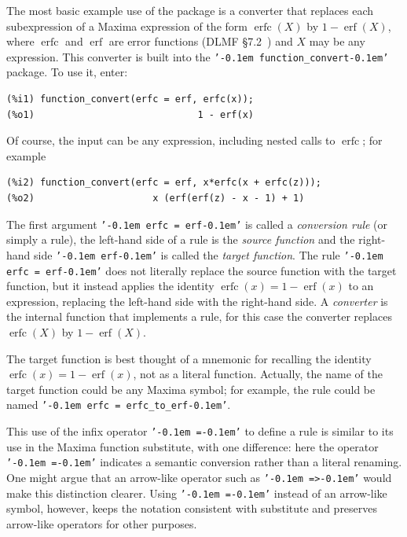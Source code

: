 \documentclass[12pt,fleqn]{extarticle}
\newcommand{\ttq}[1]{\texttt{'\kern-0.1em #1\kern-0.1em'}}
\newcommand{\funconvert}{\ttq{function\_convert}{ }}
\newenvironment{maximabox}
  {\begin{tcolorbox}[
      breakable,
      enhanced,
      colback=white,
      colframe=black!8,
      boxrule=0pt,
      borderline west={2.2pt}{0pt}{black!25},
      arc=1pt,
      left=11pt,
      right=7pt,
      top=9pt,
      bottom=9pt,
      before skip=14pt,
      after skip=14pt
    ]}
  {\end{tcolorbox}}
\DeclareMathOperator{\erf}{erf}
\DeclareMathOperator{\erfc}{erfc}
\begin{document}
The most basic example use of the package is a converter that replaces each subexpression of a Maxima expression of the form  $\erfc(X)$  by $1 - \erf(X)$, where  $\erfc$ and  $\erf$ are error functions (DLMF \S 7.2~\cite{DLMF}) and 
$X$ may be any expression. This converter is built into the \funconvert package. To use it, enter:
\begin{maximabox}
\begin{verbatim}
(%i1) function_convert(erfc = erf, erfc(x));
(%o1)                             1 - erf(x)
\end{verbatim}
\end{maximabox} 
\noindent  Of course, the input can be any expression, including nested calls to $\erfc$; for 
example
\begin{maximabox}
\begin{verbatim}
(%i2) function_convert(erfc = erf, x*erfc(x + erfc(z)));
(%o2)                     x (erf(erf(z) - x - 1) + 1)
\end{verbatim}
\end{maximabox} 
The first argument \ttq{erfc = erf} is called a \emph{conversion rule} (or simply a rule), 
the left-hand side of a rule is the \emph{source function} and the right-hand side \ttq{erf} is called the
\emph{target function}. The rule \ttq{erfc = erf} does not literally
replace the source function with the target function, but it instead applies the 
identity $\erfc(x) = 1 - \erf(x)$ to an expression, replacing the left-hand side with 
the right-hand side.  A \emph{converter} is the internal function that implements a rule,
for this case the converter replaces $\erfc(X)$  by $1 - \erf(X)$.

The target function is best thought of a mnemonic for recalling 
the identity $\erfc(x) = 1 - \erf(x)$, not as a literal function. Actually, the name of the 
target function could be any Maxima symbol; for example, the rule could be named 
\ttq{erfc = erfc\_to\_erf}.

This use of the infix operator \ttq{=} to define a rule is similar to its use in the Maxima function substitute, with one difference: here the operator \ttq{=}  indicates a semantic conversion rather than a literal renaming. One might argue that an arrow-like operator such as \ttq{=>} would make this distinction clearer. Using \ttq{=}   instead of an arrow-like symbol, however, keeps the notation consistent with substitute and preserves arrow-like operators for other purposes.
\end{document}
